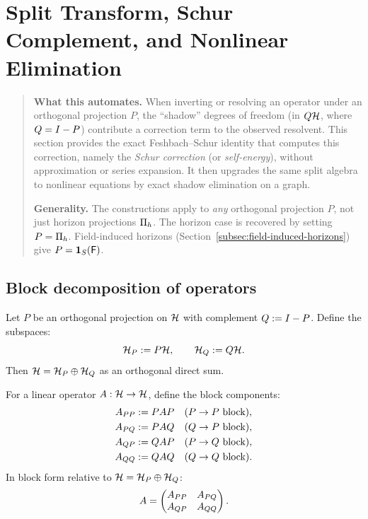 \section{Split Transform, Schur Complement, and Nonlinear Elimination}
\label{sec:resolvent-defect}

\begin{quote}\small
\textbf{What this automates.}
When inverting or resolving an operator under an orthogonal projection $P$, the ``shadow'' degrees of freedom (in $Q\mathcal{H}$, where $Q = I - P$) contribute a correction term to the observed resolvent.
This section provides the exact Feshbach--Schur identity that computes this
correction, namely the \emph{Schur correction} (or \emph{self-energy}),
without approximation or series expansion.
It then upgrades the same split algebra to nonlinear equations by exact shadow
elimination on a graph.

\smallskip\noindent
\textbf{Generality.}
The constructions apply to \emph{any} orthogonal projection $P$, not just horizon projections $\Pi_{h}$.
The horizon case is recovered by setting $P = \Pi_{h}$.
Field-induced horizons (Section~\ref{subsec:field-induced-horizons}) give $P = \mathbf{1}_{S}(\mathsf{F})$.
\end{quote}

\subsection{Block decomposition of operators}

\begin{definition}[P/Q splitting]
\label{def:pq-split}
Let $P$ be an orthogonal projection on $\mathcal{H}$ with complement $Q := I - P$.
Define the subspaces:
\[
\mathcal{H}_P := P \mathcal{H}, \qquad \mathcal{H}_{Q} := Q \mathcal{H}.
\]
Then $\mathcal{H} = \mathcal{H}_P \oplus \mathcal{H}_{Q}$ as an orthogonal direct sum.
\end{definition}

\begin{definition}
\label{def:block-components}
For a linear operator $A:\mathcal{H} \to \mathcal{H}$, define the block components:
\begin{align*}
A_{PP} &:= P A P &&\text{($P \to P$ block)}, \\
A_{PQ} &:= P A Q &&\text{($Q \to P$ block)}, \\
A_{QP} &:= Q A P &&\text{($P \to Q$ block)}, \\
A_{QQ} &:= Q A Q &&\text{($Q \to Q$ block)}.
\end{align*}
In block form relative to $\mathcal{H} = \mathcal{H}_P \oplus \mathcal{H}_{Q}$:
\[
A = \begin{pmatrix} A_{PP} & A_{PQ} \\ A_{QP} & A_{QQ} \end{pmatrix}.
\]
\end{definition}

